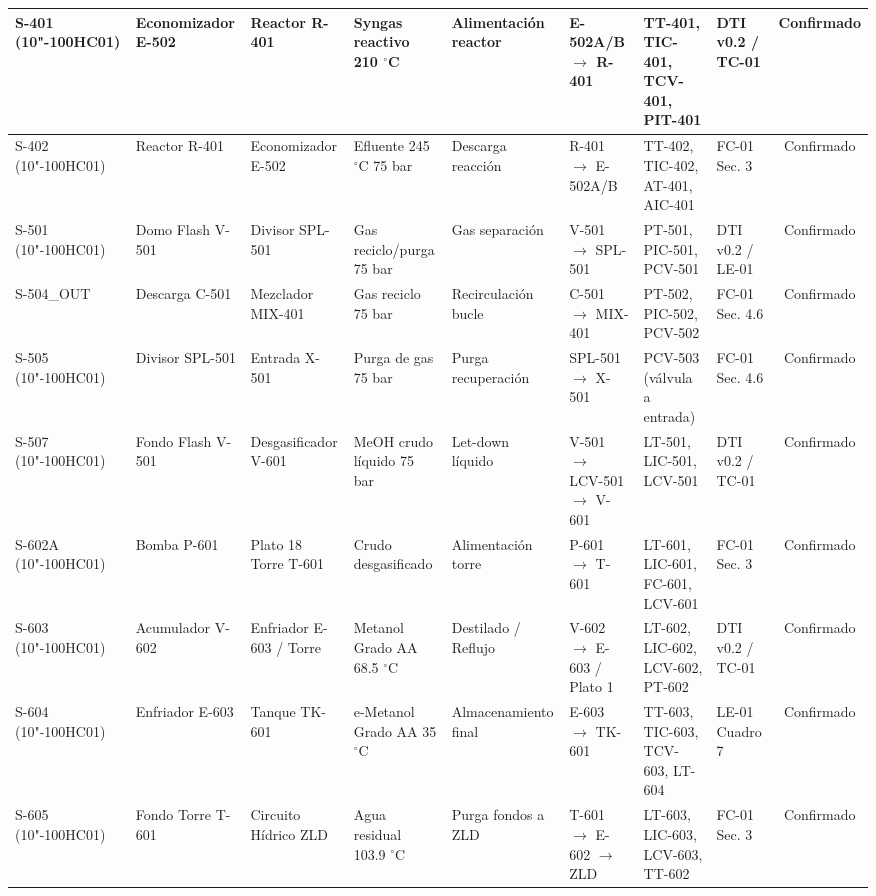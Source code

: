 \documentclass[10pt,letterpaper]{article}
\begin{document}
\begin{landscape}
\begin{table}[H]
\begin{tabularx}{\linewidth}{|p{2.0cm}|p{2.0cm}|p{2.0cm}|p{1.8cm}|p{1.6cm}|p{2.6cm}|p{3.2cm}|p{2.0cm}|c|}
S-401 (10"-100HC01) & Economizador E-502 & Reactor R-401 & Syngas reactivo 210 $^\circ$C & Alimentación reactor & E-502A/B $\to$ R-401 & TT-401, TIC-401, TCV-401, PIT-401 & DTI v0.2 / TC-01 & Confirmado \\ \hline
S-402 (10"-100HC01) & Reactor R-401 & Economizador E-502 & Efluente 245 $^\circ$C 75 bar & Descarga reacción & R-401 $\to$ E-502A/B & TT-402, TIC-402, AT-401, AIC-401 & FC-01 Sec. 3 & Confirmado \\ \hline
S-501 (10"-100HC01) & Domo Flash V-501 & Divisor SPL-501 & Gas reciclo/purga 75 bar & Gas separación & V-501 $\to$ SPL-501 & PT-501, PIC-501, PCV-501 & DTI v0.2 / LE-01 & Confirmado \\ \hline
S-504\_OUT & Descarga C-501 & Mezclador MIX-401 & Gas reciclo 75 bar & Recirculación bucle & C-501 $\to$ MIX-401 & PT-502, PIC-502, PCV-502 & FC-01 Sec. 4.6 & Confirmado \\ \hline
S-505 (10"-100HC01) & Divisor SPL-501 & Entrada X-501 & Purga de gas 75 bar & Purga recuperación & SPL-501 $\to$ X-501 & PCV-503 (válvula a entrada) & FC-01 Sec. 4.6 & Confirmado \\ \hline
S-507 (10"-100HC01) & Fondo Flash V-501 & Desgasificador V-601 & MeOH crudo líquido 75 bar & Let-down líquido & V-501 $\to$ LCV-501 $\to$ V-601 & LT-501, LIC-501, LCV-501 & DTI v0.2 / TC-01 & Confirmado \\ \hline
S-602A (10"-100HC01) & Bomba P-601 & Plato 18 Torre T-601 & Crudo desgasificado & Alimentación torre & P-601 $\to$ T-601 & LT-601, LIC-601, FC-601, LCV-601 & FC-01 Sec. 3 & Confirmado \\ \hline
S-603 (10"-100HC01) & Acumulador V-602 & Enfriador E-603 / Torre & Metanol Grado AA 68.5 $^\circ$C & Destilado / Reflujo & V-602 $\to$ E-603 / Plato 1 & LT-602, LIC-602, LCV-602, PT-602 & DTI v0.2 / TC-01 & Confirmado \\ \hline
S-604 (10"-100HC01) & Enfriador E-603 & Tanque TK-601 & e-Metanol Grado AA 35 $^\circ$C & Almacenamiento final & E-603 $\to$ TK-601 & TT-603, TIC-603, TCV-603, LT-604 & LE-01 Cuadro 7 & Confirmado \\ \hline
S-605 (10"-100HC01) & Fondo Torre T-601 & Circuito Hídrico ZLD & Agua residual 103.9 $^\circ$C & Purga fondos a ZLD & T-601 $\to$ E-602 $\to$ ZLD & LT-603, LIC-603, LCV-603, TT-602 & FC-01 Sec. 3 & Confirmado \\ \hline
\end{tabularx}
\end{table}
\end{landscape}
\end{document}
